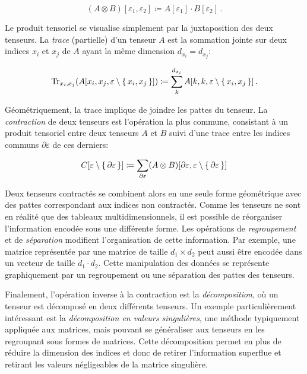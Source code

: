 \begin{equation}
    (A \otimes B)[\varepsilon_{1}, \varepsilon_{2}] \coloneq A[\varepsilon_{1}] \cdot B[\varepsilon_{2}] \,.
\end{equation}

Le produit tensoriel se visualise simplement par la juxtaposition des deux tenseurs. La \textit{trace} (partielle) d'un tenseur $A$ est la sommation jointe sur deux indices $x_{i}$ et $x_{j}$ de $A$ ayant la même dimension $d_{x_{i}} = d_{x_{j}}$:

\begin{equation}
    \text{Tr}_{x_{i}, x_{j}} (A[x_{i}, x_{j}, \varepsilon \setminus \set{x_{i}, x_{j}}]) \coloneq \sum_{k}^{d_{x_{i}}} A[k, k, \varepsilon \setminus \set{x_{i}, x_{j}} ] \,. 
\end{equation}

Géométriquement, la trace implique de joindre les pattes du tenseur. La \textit{contraction} de deux tenseurs est l'opération la plus commune, consistant à un produit tensoriel entre deux tenseurs $A$ et $B$ suivi d'une trace entre les indices communs $\partial \varepsilon$ de ces derniers:

\begin{equation}
    C[\varepsilon \setminus \set{ \partial \varepsilon}] \coloneq  \sum_{\partial \varepsilon} (A \otimes B)[\partial \varepsilon,  \varepsilon \setminus \set{ \partial \varepsilon}]
\end{equation}

Deux tenseurs contractés se combinent alors en une seule forme géométrique avec des pattes correspondant aux indices non contractés. Comme les tenseurs ne sont en réalité que des tableaux multidimensionnels, il est possible de réorganiser l'information encodée sous une différente forme. Les opérations de \textit{regroupement} et de \textit{séparation} modifient l'organisation de cette information. Par exemple, une matrice représentée par une matrice de taille $d_{1} \times d_{2}$ peut aussi être encodée dans un vecteur de taille $d_{1} \cdot d_{2}$. Cette manipulation des données se représente graphiquement par un regroupement ou une séparation des pattes des tenseurs.

Finalement, l'opération inverse à la contraction est la \textit{décomposition}, où un tenseur est décomposé en deux différents tenseurs. Un exemple particulièrement intéressant est la \textit{décomposition en valeurs singulières}, une méthode typiquement appliquée aux matrices, mais pouvant se généraliser aux tenseurs en les regroupant sous formes de matrices. Cette décomposition permet en plus de réduire la dimension des indices et donc de retirer l'information superflue et retirant les valeurs négligeables de la matrice singulière.

